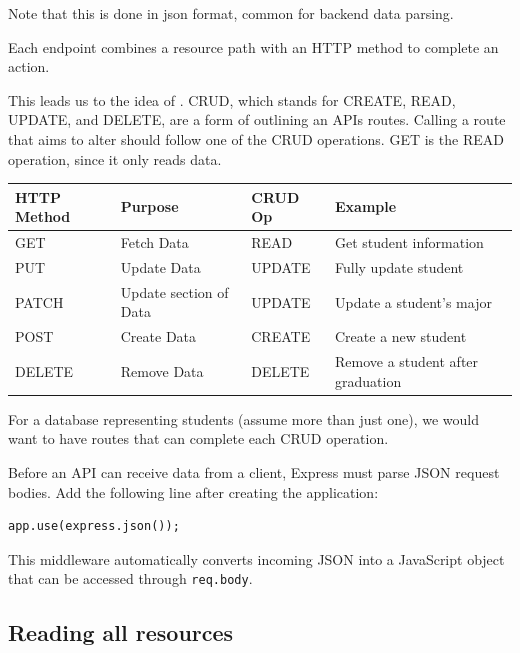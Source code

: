 Note that this is done in json format, common for backend data parsing.

Each endpoint combines a resource path with an HTTP method to complete an action.

This leads us to the idea of . CRUD, which stands for CREATE, READ, UPDATE, and DELETE, are a form of outlining an APIs routes. Calling a route that 
aims to alter should follow one of the CRUD operations. GET is the READ operation, since it only reads data.

\begin{table}[]
  \begin{tabular}{|l|l|l|l|}
    \hline
    \textbf{HTTP Method} & \textbf{Purpose}       & \textbf{CRUD Op} & \textbf{Example}                  \\ \hline
    GET                  & Fetch Data             & READ              & Get student information           \\ \hline
    PUT                  & Update Data            & UPDATE           & Fully update student              \\ \hline
    PATCH                & Update section of Data & UPDATE           & Update a student's major          \\ \hline
    POST                 & Create Data            & CREATE           & Create a new student              \\ \hline
    DELETE               & Remove Data            & DELETE           & Remove a student after graduation \\ \hline
  \end{tabular}
\end{table}

For a database representing students (assume more than just one), we would want to have 
routes that can complete each CRUD operation.

Before an API can receive data from a client, Express must parse JSON
request bodies. Add the following line after creating the application:

\begin{verbatim}
app.use(express.json());
\end{verbatim}

This middleware automatically converts incoming JSON into a JavaScript
object that can be accessed through \texttt{req.body}.

\subsection{Reading all resources}

